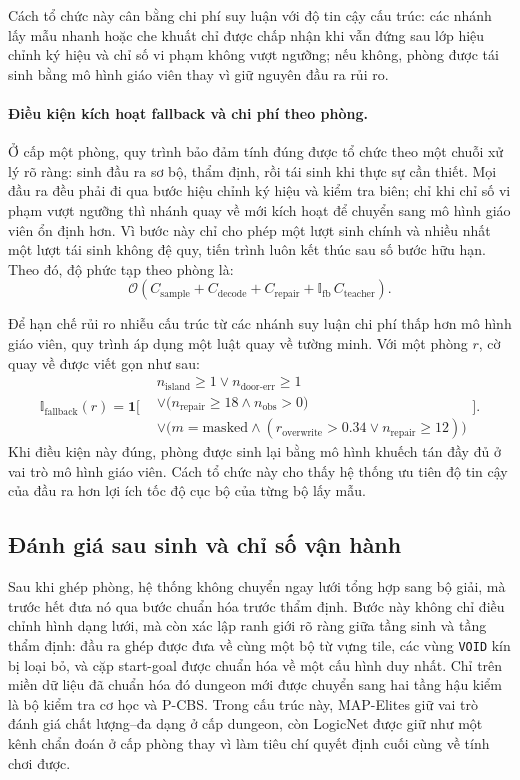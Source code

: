 \documentclass[oneside,a4paper,12pt]{extreport}
\begin{document}
Cách tổ chức này cân bằng chi phí suy luận với độ tin cậy cấu trúc: các nhánh lấy mẫu nhanh hoặc che khuất chỉ được chấp nhận khi vẫn đứng sau lớp hiệu chỉnh ký hiệu và chỉ số vi phạm không vượt ngưỡng; nếu không, phòng được tái sinh bằng mô hình giáo viên thay vì giữ nguyên đầu ra rủi ro.

\paragraph{Điều kiện kích hoạt fallback và chi phí theo phòng.}
Ở cấp một phòng, quy trình bảo đảm tính đúng được tổ chức theo một chuỗi xử lý rõ
ràng: sinh đầu ra sơ bộ, thẩm định, rồi tái sinh khi thực sự cần thiết. Mọi đầu ra đều phải đi qua bước hiệu
chỉnh ký hiệu và kiểm tra biên; chỉ khi chỉ số vi phạm vượt ngưỡng thì nhánh
quay về mới kích hoạt để chuyển sang mô hình giáo viên ổn định hơn. Vì bước này
chỉ cho phép một lượt sinh chính và nhiều nhất một lượt tái sinh không đệ
quy, tiến trình luôn kết thúc sau số bước hữu hạn. Theo đó, độ phức tạp theo
phòng là:
\begin{equation}
\mathcal{O}\!\left(C_{\text{sample}} + C_{\text{decode}} + C_{\text{repair}} + \mathbb{I}_{\text{fb}}\,C_{\text{teacher}}\right).
\end{equation}

Để hạn chế rủi ro nhiễu cấu trúc từ các nhánh suy luận chi phí thấp hơn mô hình giáo viên, quy trình áp dụng một luật quay về tường minh. Với một phòng $r$, cờ quay về được viết gọn như sau:
\begin{equation}
\mathbb{I}_{\text{fallback}}(r)=\mathbf{1}\Big[
\begin{aligned}
&n_{\text{island}}\ge 1 \lor n_{\text{door-err}}\ge 1 \\
&\lor \big(n_{\text{repair}}\ge 18\land n_{\text{obs}}>0\big) \\
&\lor \big(m=\text{masked}\land (r_{\text{overwrite}}>0.34 \lor n_{\text{repair}}\ge 12)\big)
\end{aligned}
\Big].
\end{equation}
Khi điều kiện này đúng, phòng được sinh lại bằng mô hình khuếch tán đầy đủ ở vai trò mô hình giáo viên. Cách tổ chức này cho thấy hệ thống ưu tiên độ tin cậy của đầu ra hơn lợi ích tốc độ cục bộ của từng bộ lấy mẫu.

\subsection{Đánh giá sau sinh và chỉ số vận hành}
Sau khi ghép phòng, hệ thống không chuyển ngay lưới tổng hợp sang bộ giải, mà
trước hết đưa nó qua bước chuẩn hóa trước thẩm định. Bước này không chỉ điều
chỉnh hình dạng lưới, mà còn xác lập ranh giới rõ ràng giữa tầng sinh và tầng
thẩm định: đầu ra ghép được đưa về cùng một bộ từ vựng tile, các vùng
\texttt{VOID} kín bị loại bỏ, và cặp start-goal được chuẩn hóa về một cấu hình
duy nhất. Chỉ trên miền dữ liệu đã chuẩn hóa đó dungeon mới được chuyển sang
hai tầng hậu kiểm là bộ kiểm tra cơ học và P-CBS. Trong cấu trúc này,
MAP-Elites giữ vai trò đánh giá chất lượng--đa dạng ở cấp dungeon, còn
LogicNet được giữ như một kênh chẩn đoán ở cấp phòng thay vì làm tiêu chí quyết
định cuối cùng về tính chơi được.
\end{document}
